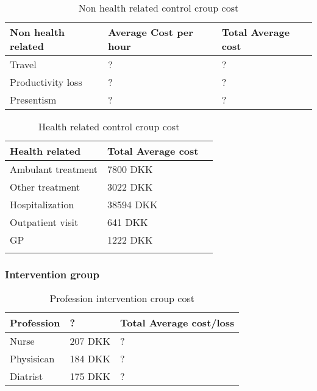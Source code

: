 \begin{table}[H]
\begin{longtabu} to 
    \textbf{Non health related} &        \textbf{Average Cost per hour} & \textbf{Total Average cost} \\[-1ex]
    \midrule
     Travel   &    ? & ? \\ \hline
     Productivity loss   &       ? & ? \\ \hline
     Presentism   &        ? & ?
    \newline
   \end{longtabu}
\caption{Non health related control croup cost}
\label{tab: NC}
\end{table}

\begin{table}[H]
\begin{longtabu} to 
    \textbf{Health related}  & \textbf{Total Average cost} \\[-1ex]
    \midrule
     Ambulant treatment    &    7800 DKK \\ \hline
     Other treatment   &     3022 DKK   \\ \hline
     Hospitalization   &      38594 DKK \\ \hline
     Outpatient visit   &      641 DKK \\ \hline
     GP   &      1222 DKK \\ \hline
    \newline
   \end{longtabu}
\caption{Health related control croup cost}
\label{tab: NC}
\end{table}



\subsubsection{Intervention group}

\begin{table}[H]
\begin{longtabu} to 
    \textbf{Profession} &        \textbf{?} & \textbf{Total Average cost/loss} \\[-1ex]
    \midrule
 	Nurse   &    207 DKK & ? \\ \hline
    Physisican   &   184 DKK    & ? \\ \hline
    Diatrist    &     175 DKK    & ?
    \newline
   \end{longtabu}
\caption{Profession intervention croup cost \cite{lonnurse, lonfys, londia}}
\label{tab: PI}
\end{table}

